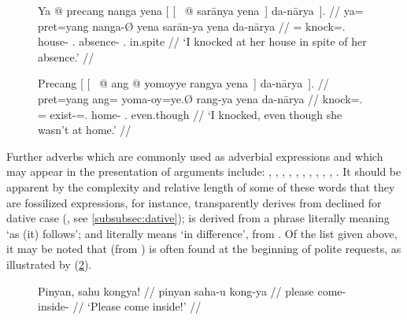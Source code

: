 \begin{figure}
\pex\label{ex:danaarya}
\a\label{ex:danaarya1}\begingl[glspace=.25em]
	\gla Ya @ precang nanga yena \textup{[ [~} @ sarānya 
		yena~\textup{]} da-nārya~\textup{]}. //
	\glb ya= pret=yang nanga-Ø yena {} sarān-ya yena da-nārya //
	\glc \LocT{}= knock=\Fsg{}.\Aarg{} house-\Top{} \TsgF{}.\Gen{} {}
		absence-\Loc{} \TsgF{}.\Gen{} in.spite //
	\glft `I knocked at her house in spite of her absence.' //
\endgl

\a\label{ex:danaarya2}\begingl
	\gla Precang \textup{[ [~} @ ang @ yomoyye rangya 
		yena~\textup{]} da-nārya~\textup{]}. //
	\glb pret=yang {} ang= yoma-oy=ye.Ø rang-ya yena da-nārya //
	\glc knock=\Fsg{}.\Aarg{} {} \AgtT{}= exist-\Neg{}=\TsgF{}.\Top{} 
		home-\Loc{} \TsgF{}.\Gen{} even.though //
	\glft `I knocked, even though she wasn't at home.' //
\endgl
\xe
\end{figure}

Further adverbs which are commonly used as adverbial expressions and which may 
appear in the presentation of arguments include:
,
,
,
,
,
,
,
,
,
,
.
It should be apparent by the complexity and relative length of some of these 
words that they are fossilized expressions, for instance, 
 transparently derives from 
 declined for dative case 
(, see \autoref{subsubsec:dative}); 
 is derived from a phrase literally meaning `as 
(it) follows'; and  literally 
means `in difference', from . Of the list given above, it may be noted that 
 (from ) is often found 
at the beginning of polite requests, as illustrated by (\ref{ex:request}).

\begin{figure}[h]
\ex\label{ex:request}
\begingl
	\gla Pinyan, sahu kongya! //
	\glb pinyan saha-u kong-ya //
	\glc please come-\Imp{} inside-\Loc{} //
	\glft `Please come inside!' //
\endgl
\xe
\end{figure}

